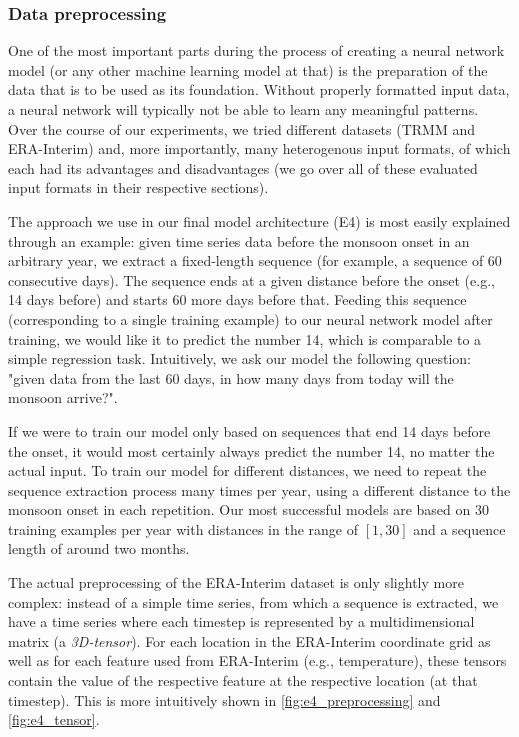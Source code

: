 \subsubsection{Data preprocessing}
One of the most important parts during the process of creating a neural network model (or any other machine learning model at that) is the preparation of the data that is to be used as its foundation. Without properly formatted input data, a neural network will typically not be able to learn any meaningful patterns. Over the course of our experiments, we tried different datasets (TRMM and ERA-Interim) and, more importantly, many heterogenous input formats, of which each had its advantages and disadvantages (we go over all of these evaluated input formats in their respective sections).

The approach we use in our final model architecture (E4) is most easily explained through an example: given time series data before the monsoon onset in an arbitrary year, we extract a fixed-length sequence (for example, a sequence of 60 consecutive days). The sequence ends at a given distance before the onset (e.g., 14 days before) and starts 60 more days before that. Feeding this sequence (corresponding to a single training example) to our neural network model after training, we would like it to predict the number 14, which is comparable to a simple regression task. Intuitively, we ask our model the following question: "given data from the last 60 days, in how many days from today will the monsoon arrive?".

If we were to train our model only based on sequences that end 14 days before the onset, it would most certainly always predict the number 14, no matter the actual input. To train our model for different distances, we need to repeat the sequence extraction process many times per year, using a different distance to the monsoon onset in each repetition. Our most successful models are based on 30 training examples per year with distances in the range of $[1, 30]$ and a sequence length of around two months.

The actual preprocessing of the ERA-Interim dataset is only slightly more complex: instead of a simple time series, from which a sequence is extracted, we have a time series where each timestep is represented by a multidimensional matrix (a \textit{3D-tensor}). For each location in the ERA-Interim coordinate grid as well as for each feature used from ERA-Interim (e.g., temperature), these tensors contain the value of the respective feature at the respective location (at that timestep). This is more intuitively shown in \cref{fig:e4_preprocessing} and \cref{fig:e4_tensor}.

